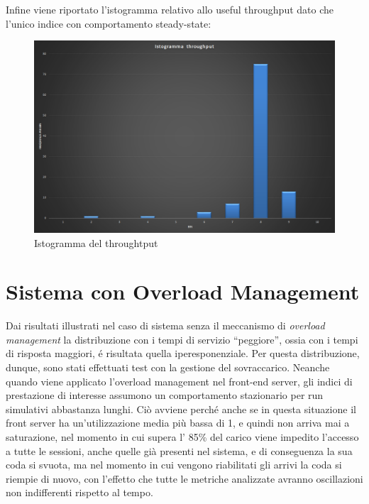Infine viene riportato l'istogramma relativo allo useful throughput dato che l'unico
indice con comportamento steady-state:

\begin{figure}[H]
 \centering
 \includegraphics[scale=0.45]{img/istogramma.png}
 \caption[Istogramma del throughtput]{Istogramma del throughtput}
 \label{fig:Istogramma del throughtput}
\end{figure}

\section{Sistema con Overload Management}

Dai risultati illustrati nel caso di sistema senza il meccanismo di \textit{overload 
management} la distribuzione con i tempi di servizio ``peggiore'', ossia con i tempi
di risposta maggiori, \'e risultata quella iperesponenziale. 
Per questa distribuzione, dunque, sono stati effettuati test con la gestione del sovraccarico.
Neanche quando viene applicato l’overload management nel front-end server, gli indici di prestazione
di interesse assumono un comportamento stazionario per run simulativi abbastanza lunghi.
Ci\`o avviene perch\'e anche se in questa situazione il front server ha un'utilizzazione media pi\`u bassa
di 1, e quindi non arriva mai a saturazione, nel momento in cui supera l' 85\% del carico viene impedito l'accesso
a tutte le sessioni, anche quelle gi\`a presenti nel sistema, e di conseguenza la sua coda si svuota, ma
nel momento in cui vengono riabilitati gli arrivi la coda si riempie di nuovo, con l'effetto che tutte le
metriche analizzate avranno oscillazioni non indifferenti rispetto al tempo.

